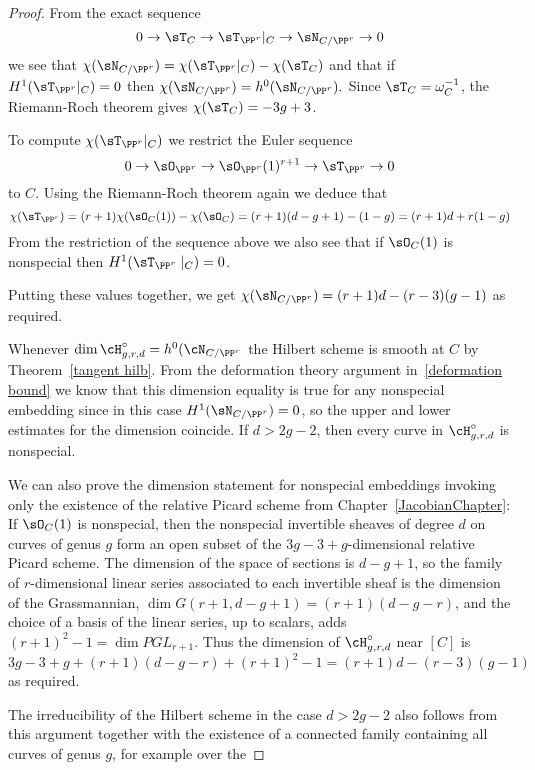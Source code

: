 \begin{proof} 
From the exact sequence
$$
0 \to \sT_C \to \sT_{\PP^r}|_C \to \sN_{C/\PP^r} \to 0
$$
we see that $\chi(\sN_{C/\PP^r}) = \chi(\sT_{\PP^r}|_C) - \chi(\sT_C)$
and that if $H^1( \sT_{\PP^r}|_C) = 0$ then $\chi(\sN_{C/\PP^r}) = h^0(\sN_{C/\PP^r}).$
Since $\sT_C = \omega_C^{-1}$, the Riemann-Roch theorem gives $\chi(\sT_C) = -3g+3$.

To compute $\chi(\sT_{\PP^r}|_C)$ we restrict the Euler sequence
$$
0\to \sO_{\PP^r} \to \sO_{\PP^r}(1)^{r+1} \to \sT_{\PP^r} \to 0
$$
to $C$.
Using the Riemann-Roch theorem again we deduce that
$$
\chi( \sT_{\PP^r} ) = (r+1)\chi(\sO_C(1)) - \chi(\sO_C) = (r+1)(d-g+1) - (1-g) = (r+1)d + r(1-g)
$$
From the restriction of the sequence above we also see that
if $\sO_C(1)$ is nonspecial then $H^1(\sT_{\PP^r}\mid_C) = 0$.

Putting these values together, we get
$
\chi(\sN_{C/\PP^r}) = (r+1)d - (r-3)(g-1)
$
as required.

Whenever $\dim \cH^\circ_{g,r,d} = h^{0}(\cN_{C/\PP^{r}} $ the Hilbert scheme is smooth at $C$ by
Theorem~\ref{tangent hilb}. 
From the deformation theory argument
in~\ref{deformation bound} we know that this dimension equality is true for any
nonspecial embedding since in this case 
$H^1(\sN_{C/\PP^r}) = 0$, so the upper and lower estimates for the dimension
coincide. If $d>2g-2$, then every curve in $\cH^\circ_{g,r,d}$ is nonspecial.

We can also prove the dimension statement for nonspecial embeddings invoking only the existence of the relative Picard scheme from
Chapter~\ref{JacobianChapter}: 
If $\sO_C(1)$ is nonspecial, then the
nonspecial invertible sheaves of degree $d$ on curves of genus $g$
 form an open subset of the $3g-3+ g$-dimensional relative Picard scheme. The dimension
 of the space of sections is $d-g+1$, so the family of $r$-dimensional linear series associated to
 each invertible sheaf is the dimension of the Grassmannian, $\dim G(r+1, d-g+1) = (r+1)(d-g-r)$,
 and the choice of a basis of the linear series, up to scalars, adds $(r+1)^2-1 = \dim PGL_{r+1}$. 
 Thus the dimension of  $\cH^\circ_{g,r,d}$ near $[C]$ is
$$
3g-3+ g + (r+1)(d-g-r) + (r+1)^2-1 = (r+1)d - (r-3)(g-1)
$$
as required. 

 The irreducibility of the Hilbert scheme in the case $d>2g-2$ also follows from this argument 
together with the existence of a connected family containing all curves of genus $g$, for example over the
\end{proof}



